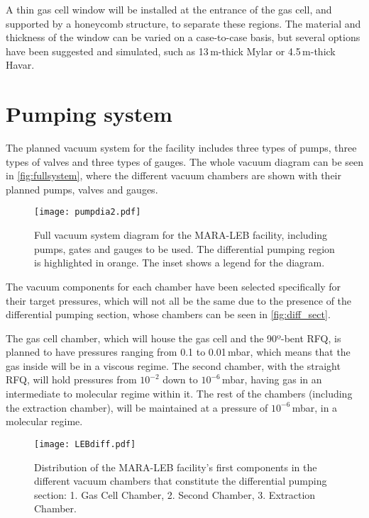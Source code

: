 A thin gas cell window will be installed at the entrance of the gas cell, and supported by a honeycomb structure, to separate these regions. The material and thickness of the window can be varied on a case-to-case basis, but several options have been suggested and simulated, such as 13\,\textmu m-thick Mylar or 4.5\,\textmu m-thick Havar.

\section{Pumping system}
\label{sec:pump}

The planned vacuum system for the facility includes three types of pumps, three types of valves and three types of gauges. The whole vacuum diagram can be seen in \autoref{fig:fullsystem}, where the different vacuum chambers are shown with their planned pumps, valves and gauges.

\begin{figure}[h]
    \centering
    \texttt{[image: pumpdia2.pdf]}
     \caption[Full vacuum system for MARA-LEB]{Full vacuum system diagram for the MARA-LEB facility, including pumps, gates and gauges to be used. The differential pumping region is highlighted in orange. The inset shows a legend for the diagram.}
     \label{fig:fullsystem}
 \end{figure}

The vacuum components for each chamber have been selected specifically for their target pressures, which will not all be the same due to the presence of the differential pumping section, whose chambers can be seen in \autoref{fig:diff_sect}. 
\newpage

The gas cell chamber, which will house the gas cell and the 90º-bent RFQ, is planned to have pressures ranging from 0.1 to 0.01\,mbar, which means that the gas inside will be in a viscous regime. The second chamber, with the straight RFQ, will hold pressures from $10^{-2}$ down to $10^{-6}$\,mbar, having gas in an intermediate to molecular regime within it. The rest of the chambers (including the extraction chamber), will be maintained at a pressure of $10^{-6}$\,mbar, in a molecular regime. 


 \begin{figure}[H]
     \centering
      \texttt{[image: LEBdiff.pdf]}
      \caption[Differential pumping chamber distribution]{Distribution of the MARA-LEB facility's first components in the different vacuum chambers that constitute the differential pumping section: 1. Gas Cell Chamber, 2. Second Chamber, 3. Extraction Chamber.}
      \label{fig:diff_sect}
  \end{figure}

